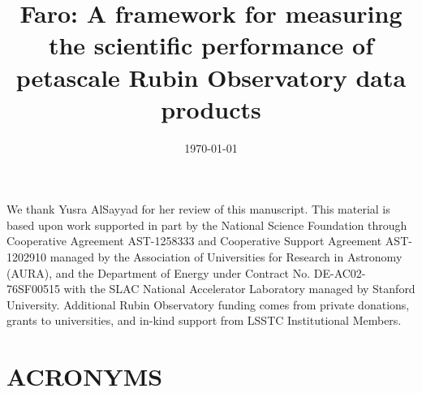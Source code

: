 \documentclass[]{spie}
\title{Faro: A framework for measuring the scientific performance of petascale Rubin Observatory data products}
\date{\today}
\def\acronyms{\section*{ACRONYMS}\label{sec:acronyms}}
\begin{document}
\maketitle





\appendix
%

\acknowledgments

We thank Yusra AlSayyad for her review of this manuscript.
This material is based upon work supported in part by the National Science Foundation through Cooperative Agreement AST-1258333 and Cooperative Support Agreement AST-1202910 managed by the Association of Universities for Research in Astronomy (AURA), and the Department of Energy under Contract No. DE-AC02-76SF00515 with the SLAC National Accelerator Laboratory managed by Stanford University. 
Additional Rubin Observatory funding comes from private donations, grants to universities, and in-kind support from LSSTC Institutional Members.




\acronyms 

\end{document}
